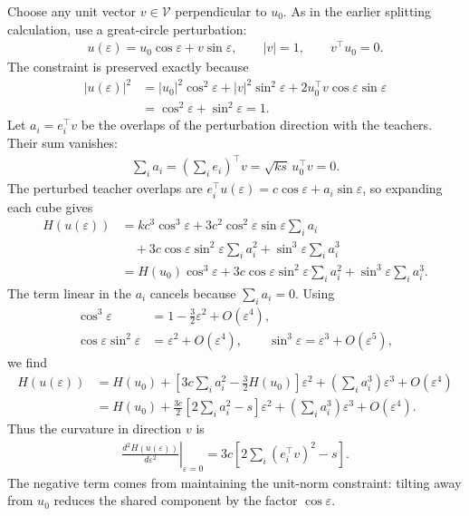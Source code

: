 \documentclass[11pt, reqno]{amsart}
\theoremstyle{notestyle}
\theoremstyle{defstyle}
\begin{document}
Choose any unit vector $v\in\mathcal V$ perpendicular to $u_0$.
As in the earlier splitting calculation, use a great-circle perturbation:
\begin{align*}
    u(\varepsilon)=u_0\cos\varepsilon+v\sin\varepsilon,
    \qquad |v|=1,
    \qquad v^\top u_0=0.
\end{align*}
The constraint is preserved exactly because
\begin{align*}
    |u(\varepsilon)|^2
    &=|u_0|^2\cos^2\varepsilon+|v|^2\sin^2\varepsilon
      +2u_0^\top v\cos\varepsilon\sin\varepsilon \\
    &=\cos^2\varepsilon+\sin^2\varepsilon=1.
\end{align*}
Let $a_i=e_i^\top v$ be the overlaps of the perturbation direction with the teachers.
Their sum vanishes:
\begin{align*}
    \sum_i a_i
    =\left(\sum_i e_i\right)^\top v
    =\sqrt{ks}\,u_0^\top v=0.
\end{align*}
The perturbed teacher overlaps are $e_i^\top u(\varepsilon)=c\cos\varepsilon+a_i\sin\varepsilon$, so expanding each cube gives
\begin{align*}
    H(u(\varepsilon))
    &=kc^3\cos^3\varepsilon
      +3c^2\cos^2\varepsilon\sin\varepsilon\sum_i a_i \\
    &\quad+3c\cos\varepsilon\sin^2\varepsilon\sum_i a_i^2
      +\sin^3\varepsilon\sum_i a_i^3 \\
    &=H(u_0)\cos^3\varepsilon
      +3c\cos\varepsilon\sin^2\varepsilon\sum_i a_i^2
      +\sin^3\varepsilon\sum_i a_i^3.
\end{align*}
The term linear in the $a_i$ cancels because $\sum_i a_i=0$.
Using
\begin{align*}
    \cos^3\varepsilon&=1-\frac32\varepsilon^2+O(\varepsilon^4), \\
    \cos\varepsilon\sin^2\varepsilon&=\varepsilon^2+O(\varepsilon^4),
    \qquad \sin^3\varepsilon=\varepsilon^3+O(\varepsilon^5),
\end{align*}
we find
\begin{align*}
    H(u(\varepsilon))
    &=H(u_0)
      +\left[3c\sum_i a_i^2-\frac32 H(u_0)\right]\varepsilon^2
      +\left(\sum_i a_i^3\right)\varepsilon^3+O(\varepsilon^4) \\
    &=H(u_0)
      +\frac{3c}{2}\left[2\sum_i a_i^2-s\right]\varepsilon^2
      +\left(\sum_i a_i^3\right)\varepsilon^3+O(\varepsilon^4).
\end{align*}
Thus the curvature in direction $v$ is
\begin{align}\label{eq:row-sum-tangent-curvature}
    \left.\frac{d^2H(u(\varepsilon))}{d\varepsilon^2}\right|_{\varepsilon=0}
    =3c\left[2\sum_i(e_i^\top v)^2-s\right].
\end{align}
The negative term comes from maintaining the unit-norm constraint: tilting away from $u_0$ reduces the shared component by the factor $\cos\varepsilon$.
\end{document}
